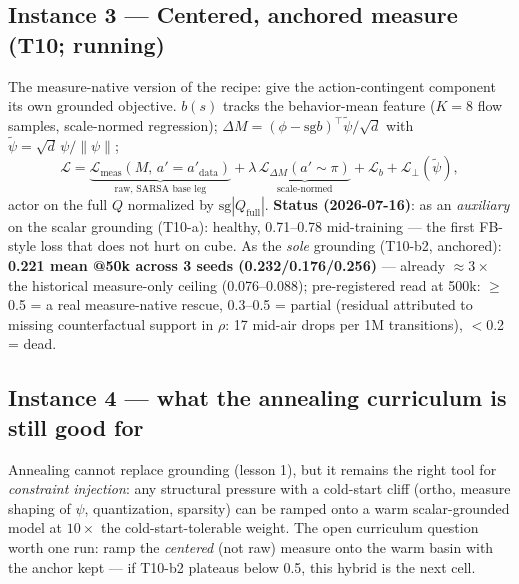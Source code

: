 \documentclass[11pt]{article}
\newcommand{\sg}{\mathrm{sg}}
\newcommand{\numgood}[1]{\textbf{\textcolor{green!45!black}{#1}}}
\begin{document}
\subsection{Instance 3 --- Centered, anchored measure (T10; running)}\label{sec:t10}
The measure-native version of the recipe: give the action-contingent component its own
grounded objective. $b(s)$ tracks the behavior-mean feature ($K{=}8$ flow samples,
scale-normed regression); $\Delta M = (\phi-\sg b)^\top\tilde\psi/\sqrt d$ with
$\tilde\psi=\sqrt d\,\psi/\|\psi\|$;
\begin{equation}
\mathcal L =
\underbrace{\mathcal L_{\mathrm{meas}}(M,\,a'{=}a'_{\mathrm{data}})}_{\text{raw, SARSA base leg}}
+ \lambda\,\underbrace{\mathcal L_{\Delta M}(a'{\sim}\pi)}_{\text{scale-normed}}
+ \mathcal L_b + \mathcal L_\perp(\tilde\psi),
\end{equation}
actor on the full $Q$ normalized by $\sg|Q_{\mathrm{full}}|$.
\textbf{Status (2026-07-16)}: as an \emph{auxiliary} on the scalar grounding (T10-a):
healthy, 0.71--0.78 mid-training --- the first FB-style loss that does not hurt on cube.
As the \emph{sole} grounding (T10-b2, anchored): \numgood{0.221 mean @50k across 3 seeds
(0.232/0.176/0.256)} --- already $\approx 3\times$ the historical measure-only ceiling
(0.076--0.088); pre-registered read at 500k: $\ge$0.5 = a real measure-native rescue,
0.3--0.5 = partial (residual attributed to missing counterfactual support in $\rho$:
17 mid-air drops per 1M transitions), $<$0.2 = dead.

\subsection{Instance 4 --- what the annealing curriculum is still good for}
Annealing cannot replace grounding (lesson 1), but it remains the right tool for
\emph{constraint injection}: any structural pressure with a cold-start cliff (ortho, measure
shaping of $\psi$, quantization, sparsity) can be ramped onto a warm scalar-grounded model at
$10\times$ the cold-start-tolerable weight. The open curriculum question worth one run: ramp
the \emph{centered} (not raw) measure onto the warm basin with the anchor kept --- if
T10-b2 plateaus below 0.5, this hybrid is the next cell.
\end{document}
